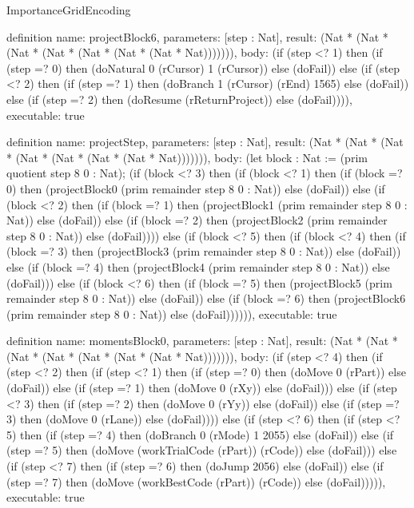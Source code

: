 \begin{lexlean}{ImportanceGridEncoding}
\begin{semanticmodule}
definition{
  name: projectBlock6,
  parameters: [step : Nat],
  result: (Nat * (Nat * (Nat * (Nat * (Nat * (Nat * (Nat * Nat))))))),
  body: (if (step <? 1) then
      (if (step =? 0) then (doNatural 0 (rCursor) 1 (rCursor)) else (doFail)) else
      (if (step <? 2) then
      (if (step =? 1) then (doBranch 1 (rCursor) (rEnd) 1565) else (doFail)) else
      (if (step =? 2) then (doResume (rReturnProject)) else (doFail)))),
  executable: true
}

definition{
  name: projectStep,
  parameters: [step : Nat],
  result: (Nat * (Nat * (Nat * (Nat * (Nat * (Nat * (Nat * Nat))))))),
  body: (let block : Nat := (prim quotient step 8 0 : Nat); (if (block <? 3) then
      (if (block <? 1) then
      (if (block =? 0) then (projectBlock0 (prim remainder step 8 0 : Nat)) else (doFail)) else
      (if (block <? 2) then
      (if (block =? 1) then (projectBlock1 (prim remainder step 8 0 : Nat)) else (doFail)) else
      (if (block =? 2) then (projectBlock2 (prim remainder step 8 0 : Nat)) else (doFail)))) else
      (if (block <? 5) then
      (if (block <? 4) then
      (if (block =? 3) then (projectBlock3 (prim remainder step 8 0 : Nat)) else (doFail)) else
      (if (block =? 4) then (projectBlock4 (prim remainder step 8 0 : Nat)) else (doFail))) else
      (if (block <? 6) then
      (if (block =? 5) then (projectBlock5 (prim remainder step 8 0 : Nat)) else (doFail)) else
      (if (block =? 6) then (projectBlock6 (prim remainder step 8 0 : Nat)) else (doFail)))))),
  executable: true
}

definition{
  name: momentsBlock0,
  parameters: [step : Nat],
  result: (Nat * (Nat * (Nat * (Nat * (Nat * (Nat * (Nat * Nat))))))),
  body: (if (step <? 4) then
      (if (step <? 2) then
      (if (step <? 1) then
      (if (step =? 0) then (doMove 0 (rPart)) else (doFail)) else
      (if (step =? 1) then (doMove 0 (rXy)) else (doFail))) else
      (if (step <? 3) then
      (if (step =? 2) then (doMove 0 (rYy)) else (doFail)) else
      (if (step =? 3) then (doMove 0 (rLane)) else (doFail)))) else
      (if (step <? 6) then
      (if (step <? 5) then
      (if (step =? 4) then (doBranch 0 (rMode) 1 2055) else (doFail)) else
      (if (step =? 5) then (doMove (workTrialCode (rPart)) (rCode)) else (doFail))) else
      (if (step <? 7) then
      (if (step =? 6) then (doJump 2056) else (doFail)) else
      (if (step =? 7) then (doMove (workBestCode (rPart)) (rCode)) else (doFail))))),
  executable: true
}


\end{semanticmodule}
\end{lexlean}
